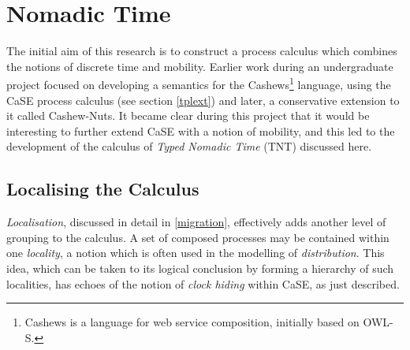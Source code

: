 
\chapter{Nomadic Time}
\label{nt}

The initial aim of this research is to construct a process calculus which
combines the notions of discrete time and mobility.  Earlier work
during an undergraduate project focused on developing a semantics for
the Cashews\footnote{Cashews is a language for web service
  composition, initially based on OWL-S.}\cite{cashews-sem} language,
using the CaSE process calculus (see section \ref{tplext}) and later,
a conservative extension to it called Cashew-Nuts.  It became clear
during this project that it would be interesting to further extend CaSE
with a notion of mobility, and this led to the development of the
calculus of \emph{Typed Nomadic Time} (TNT) discussed here.

\section{Localising the Calculus}

\emph{Localisation}, discussed in detail in \ref{migration}, effectively
adds another level of grouping to the calculus.  A set of composed
processes may be contained within one \emph{locality}, a notion which is
often used in the modelling of \emph{distribution}.  This idea, which
can be taken to its logical conclusion by forming a hierarchy of such
localities, has echoes of the notion of \emph{clock hiding} within CaSE,
as just described.

